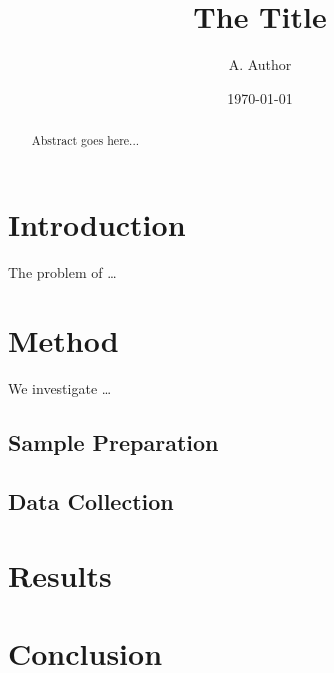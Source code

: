 \documentclass{article}
\title{The Title}
\author{A. Author}
\date{\today}
\begin{document}
\maketitle

\begin{abstract} 
	Abstract goes here... 
\end{abstract}


\section{Introduction}
The problem of \ldots

\section{Method}
We investigate \ldots

\subsection{Sample Preparation}

\subsection{Data Collection}

\section{Results}

\section{Conclusion}
\end{document}
